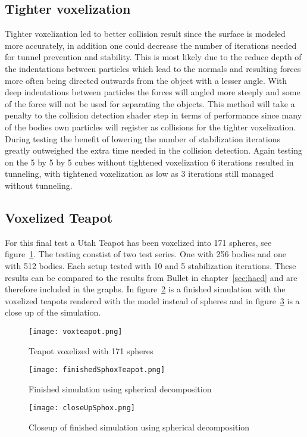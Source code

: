 \subsection{Tighter voxelization}
Tighter voxelization led to better collision result since the surface is modeled
more accurately, in addition one could decrease the number of iterations needed
for tunnel prevention and stability. This is most likely due to the reduce depth
of the indentations between particles which lead to the normals and resulting forces more often
being directed outwards from the object with a lesser angle.
 With deep indentations between particles the forces will angled more steeply and
  some of the force will not be used for separating the objects.
This method will take a penalty to the collision detection shader step in
terms of performance since many of the bodies own particles will register as collisions
for the tighter voxelization. During testing the benefit of lowering the number of
stabilization iterations greatly outweighed the extra time needed in the collision
detection. Again testing on the 5 by 5 by 5 cubes without tightened voxelization 6 iterations resulted in
tunneling, with tightened voxelization as low as 3 iterations still managed without tunneling.

\subsection{Voxelized Teapot}\label{sec:teapot}
For this final test a Utah Teapot has been voxelized into 171 spheres, see figure~\ref{fig:voxteapot}.
The testing constist of two test series. One with 256 bodies and one with 512 bodies.
Each setup tested with 10 and 5 stabilization iterations. These results can be compared to the
results from Bullet in chapter~\ref{sec:hacd} and are therefore included in the graphs.
In figure~\ref{fig:voxFinish} is a finished simulation with the voxelized teapots rendered
with the model instead of spheres and
in figure~\ref{fig:voxCloseup} is a close up of the simulation.

\begin{figure}[H]
  \centering
  \texttt{[image: voxteapot.png]}
  \caption{Teapot voxelized with 171 spheres}
  \label{fig:voxteapot}
\end{figure}

\begin{figure}[H]
  \centering
  \texttt{[image: finishedSphoxTeapot.png]}
  \caption{Finished simulation using spherical decomposition}
  \label{fig:voxFinish}
\end{figure}
\begin{figure}[H]
  \centering
  \texttt{[image: closeUpSphox.png]}
  \caption{Closeup of finished simulation using spherical decomposition}
  \label{fig:voxCloseup}
\end{figure}



